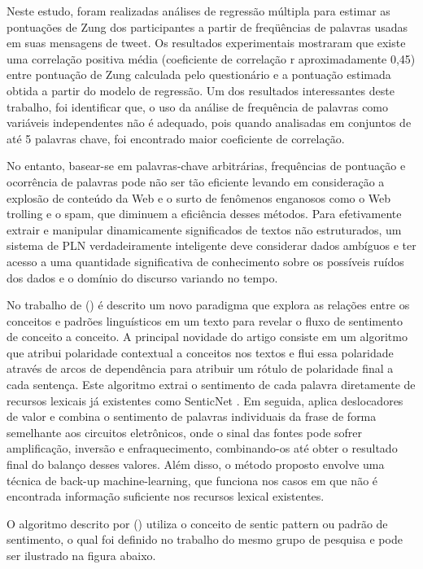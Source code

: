 \documentclass[
	12pt,				%
	openright,			%
	oneside,			%
	a4paper,			%
	english,			%
	spanish,			%
	brazil				%
	]{abntex2}
\begin{document}
	Neste estudo, foram realizadas análises de regressão múltipla para estimar as pontuações de Zung dos participantes a partir de freqüências de palavras usadas em suas mensagens de tweet. Os resultados experimentais mostraram que existe uma correlação positiva média (coeficiente de correlação r aproximadamente 0,45) entre pontuação de Zung calculada pelo questionário e a pontuação estimada obtida a partir do modelo de regressão. Um dos resultados interessantes deste trabalho, foi identificar que, o uso da análise de frequência de palavras como variáveis independentes não é adequado, pois quando analisadas em conjuntos de até 5 palavras chave, foi encontrado maior coeficiente de correlação.

	No entanto, basear-se em palavras-chave arbitrárias, frequências de pontuação e ocorrência de palavras pode não ser tão eficiente levando em consideração a explosão de conteúdo da Web e o surto de fenômenos enganosos como o Web trolling e o spam, que diminuem a eficiência desses métodos. Para efetivamente extrair e manipular dinamicamente significados de textos não estruturados, um sistema de PLN verdadeiramente inteligente deve considerar dados ambíguos e ter acesso a uma quantidade significativa de conhecimento sobre os possíveis ruídos dos dados e o domínio do discurso variando no tempo.

	No trabalho de  (\citeyear{article_sentiment_analysis}) é descrito um novo paradigma que explora as relações entre os conceitos e padrões linguísticos em um texto para revelar o fluxo de sentimento de conceito a conceito. A principal novidade do artigo consiste em um algoritmo que atribui polaridade contextual a conceitos nos textos e flui essa polaridade através de arcos de dependência para atribuir um rótulo de polaridade final a cada sentença. Este algoritmo extrai o sentimento de cada palavra diretamente de recursos lexicais já existentes como SenticNet  \cite{Cambria2014}. Em seguida, aplica deslocadores de valor e combina o sentimento de palavras individuais da frase de forma semelhante aos circuitos eletrônicos, onde o sinal das fontes pode sofrer amplificação, inversão e enfraquecimento, combinando-os até obter o resultado final do balanço desses valores. Além disso, o método proposto envolve uma técnica de back-up machine-learning, que funciona nos casos em que não é encontrada informação suficiente nos recursos lexical existentes.

 	O algoritmo descrito por  (\citeyear{article_sentiment_analysis}) utiliza o conceito de sentic pattern ou padrão de sentimento, o qual foi definido no trabalho do mesmo grupo de pesquisa \cite{article_Poria2014} e pode ser ilustrado na figura abaixo.
\end{document}

